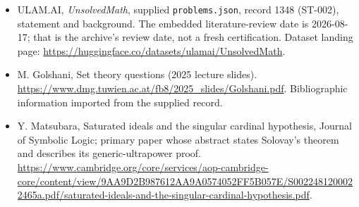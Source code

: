 \documentclass[11pt,a4paper]{article}
\begin{document}
{\small

\begin{itemize}

\item[\hypertarget{source:1348:1}{S1}] ULAM.AI, \emph{UnsolvedMath}, supplied \texttt{problems.json}, record 1348 (ST-002), statement and background. The embedded literature-review date is 2026-08-17; that is the archive’s review date, not a fresh certification. Dataset landing page: \url{https://huggingface.co/datasets/ulamai/UnsolvedMath}.

\item[\hypertarget{source:1348:2}{S2}] M. Golshani, Set theory questions (2025 lecture slides). \url{https://www.dmg.tuwien.ac.at/fb8/2025_slides/Golshani.pdf}. Bibliographic information imported from the supplied record.

\item[R1] Y. Matsubara, Saturated ideals and the singular cardinal hypothesis, Journal of Symbolic Logic; primary paper whose abstract states Solovay’s theorem and describes its generic-ultrapower proof.
\url{https://www.cambridge.org/core/services/aop-cambridge-core/content/view/9AA9D2B987612AA9A0574052FF5B057E/S0022481200022465a.pdf/saturated-ideals-and-the-singular-cardinal-hypothesis.pdf}.
\end{itemize}

}

\label{end:1348}
\end{document}
